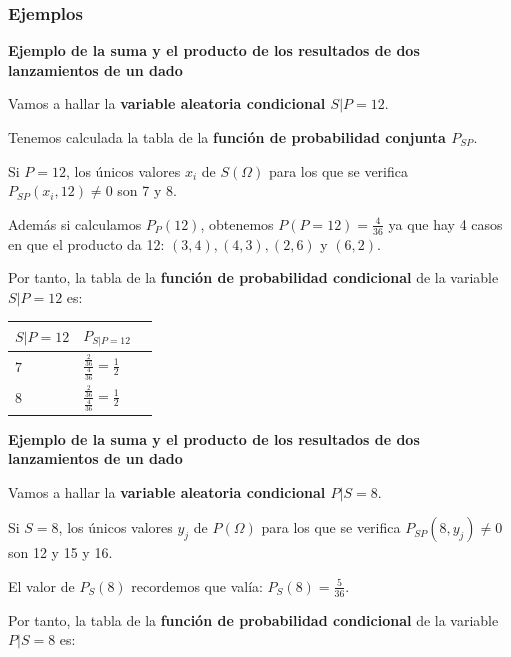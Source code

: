 \documentclass[]{book}
\begin{document}
\hypertarget{ejemplos-6}{%
\subsubsection{Ejemplos}\label{ejemplos-6}}

\textbf{Ejemplo de la suma y el producto de los resultados de dos lanzamientos de un dado}

Vamos a hallar la \textbf{variable aleatoria condicional \(S|P=12\)}.

Tenemos calculada la tabla de la \textbf{función de probabilidad conjunta \(P_{SP}\)}.

Si \(P=12\), los únicos valores \(x_i\) de \(S(\Omega)\) para los que se verifica \(P_{SP}(x_i,12)\neq 0\) son 7 y 8.

Además si calculamos \(P_P(12)\), obtenemos \(P(P=12)=\frac{4}{36}\) ya que hay 4 casos en que el producto da 12: \((3,4), (4,3), (2,6)\) y \((6,2)\).

Por tanto, la tabla de la \textbf{función de probabilidad condicional} de la variable \(S|P=12\) es:

\begin{longtable}[]{@{}lll@{}}
\toprule
\(S|P=12\) & \(P_{S|P=12}\) &\tabularnewline
\midrule
\endhead
\(7\) & \(\frac{\frac{2}{36}}{\frac{4}{36}}=\frac{1}{2}\) &\tabularnewline
\(8\) & \(\frac{\frac{2}{36}}{\frac{4}{36}}=\frac{1}{2}\) &\tabularnewline
\bottomrule
\end{longtable}

\textbf{Ejemplo de la suma y el producto de los resultados de dos lanzamientos de un dado}

Vamos a hallar la \textbf{variable aleatoria condicional \(P|S=8\)}.

Si \(S=8\), los únicos valores \(y_j\) de \(P(\Omega)\) para los que se verifica \(P_{SP}(8,y_j)\neq 0\) son 12 y 15 y 16.

El valor de \(P_S(8)\) recordemos que valía: \(P_S(8)=\frac{5}{36}\).

Por tanto, la tabla de la \textbf{función de probabilidad condicional} de la variable \(P|S=8\) es:
\end{document}
